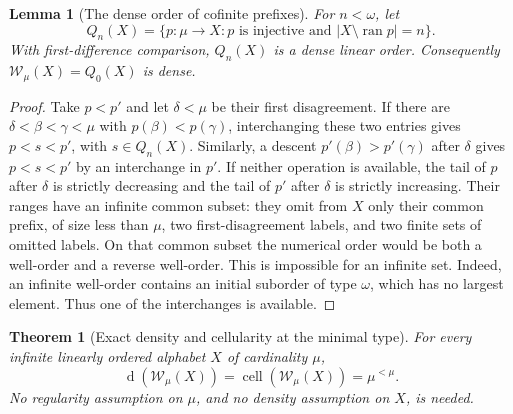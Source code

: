 \documentclass[11pt]{article}
\newtheorem{theorem}{Theorem}[section]
\newtheorem{lemma}[lemma]{Lemma}
\theoremstyle{definition}
\theoremstyle{remark}
\newcommand{\WO}{\mathcal W}
\newcommand{\dens}{\operatorname{d}}
\newcommand{\cell}{\operatorname{cell}}
\begin{document}
\begin{lemma}[The dense order of cofinite prefixes]
\label{swo:sh:lem:new-cofinite-prefixes}
For $n<\omega$, let
\[
 Q_n(X)=\{p:\mu\to X:p\text{ is injective and }
                       |X\setminus\operatorname{ran}p|=n\}.
\]
With first-difference comparison, $Q_n(X)$ is a dense linear order.
Consequently $\WO_\mu(X)=Q_0(X)$ is dense.
\end{lemma}

\begin{proof}
Take $p<p'$ and let $\delta<\mu$ be their first disagreement.  If there
are $\delta<\beta<\gamma<\mu$ with $p(\beta)<p(\gamma)$, interchanging
these two entries gives $p<s<p'$, with $s\in Q_n(X)$.  Similarly, a
descent $p'(\beta)>p'(\gamma)$ after $\delta$ gives $p<s<p'$ by an
interchange in $p'$.  If neither operation is available, the tail of
$p$ after $\delta$ is strictly decreasing and the tail of $p'$ after
$\delta$ is strictly increasing.  Their ranges have an infinite common
subset: they omit from $X$ only their common prefix, of size less than
$\mu$, two first-disagreement labels, and two finite sets of omitted
labels.  On that common subset the numerical order would be both a
well-order and a reverse well-order.  This is impossible for an
infinite set.  Indeed, an infinite well-order contains an initial
suborder of type $\omega$, which has no largest element.  Thus one of
the interchanges is available.
\end{proof}

\begin{theorem}[Exact density and cellularity at the minimal type]
\label{swo:sh:thm:new-minimal-density}
For every infinite linearly ordered alphabet $X$ of cardinality $\mu$,
\[
 \boxed{\quad \dens(\WO_\mu(X))
                 =\cell(\WO_\mu(X))=\mu^{<\mu}.\quad}
\]
No regularity assumption on $\mu$, and no density assumption on $X$,
is needed.
\end{theorem}
\end{document}
